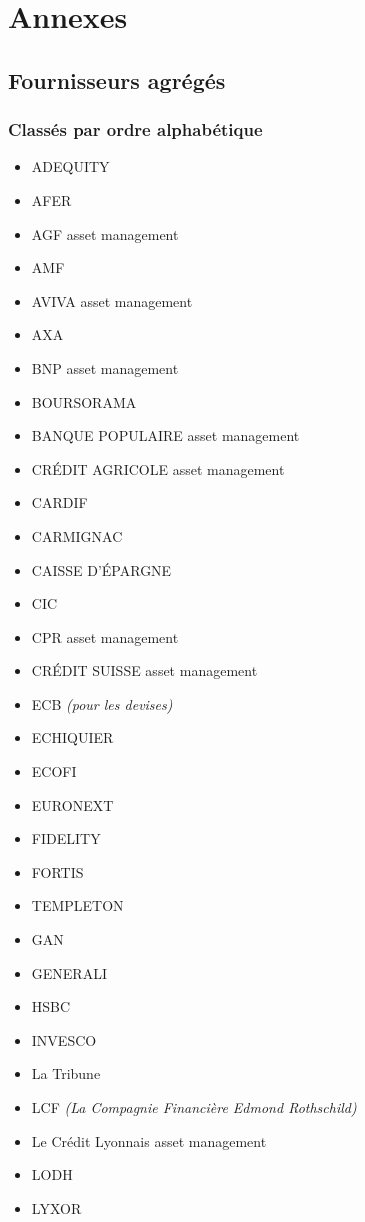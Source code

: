 \chapter{Annexes}
\section{Fournisseurs agrégés}\label{fournisseurs} 
\subsection{Class\'es par ordre alphab\'etique}
\begin{itemize}
\item ADEQUITY
\item AFER
\item AGF asset management
\item AMF
\item AVIVA asset management
\item AXA
\item BNP asset management
\item BOURSORAMA
\item BANQUE POPULAIRE asset management
\item CRÉDIT AGRICOLE asset management
\item CARDIF
\item CARMIGNAC
\item CAISSE D'ÉPARGNE
\item CIC
\item CPR asset management
\item CRÉDIT SUISSE asset management
\item ECB \textit{(pour les devises)}
\item ECHIQUIER
\item ECOFI
\item EURONEXT
\item FIDELITY
\item FORTIS
\item TEMPLETON
\item GAN
\item GENERALI
\item HSBC
\item INVESCO
\item La Tribune
\item LCF \textit{(La Compagnie Financière Edmond Rothschild)}
\item Le Crédit Lyonnais asset management
\item LODH
\item LYXOR

\end{itemize}
